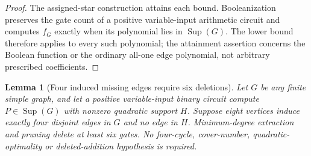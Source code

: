 \documentclass[11pt]{article}
\newcommand{\Sup}{\operatorname{Sup}}
\newtheorem{lemma}[theorem]{Lemma}
\theoremstyle{definition}
\theoremstyle{remark}
\begin{document}
\begin{proof}
The assigned-star construction attains each bound. Booleanization preserves the gate count of a positive variable-input arithmetic circuit and computes $f_G$ exactly when its polynomial lies in $\Sup(G)$. The lower bound therefore applies to every such polynomial; the attainment assertion concerns the Boolean function or the ordinary all-one edge polynomial, not arbitrary prescribed coefficients.
\end{proof}

\begin{lemma}[Four induced missing edges require six deletions]\label{lem:fourmatchinglost}
Let $G$ be any finite simple graph, and let a positive variable-input binary circuit compute $P\in\Sup(G)$ with nonzero quadratic support $H$. Suppose eight vertices induce exactly four disjoint edges in $G$ and no edge in $H$. Minimum-degree extraction and pruning delete at least six gates. No four-cycle, cover-number, quadratic-optimality or deleted-addition hypothesis is required.
\end{lemma}
\end{document}
